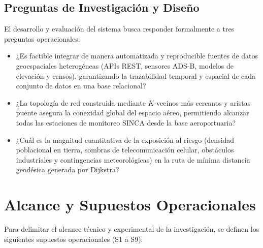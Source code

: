 \documentclass[letterpaper,12pt]{article}
\begin{document}
\subsection{Preguntas de Investigación y Diseño}
\label{subsec:preguntas_diseno}

El desarrollo y evaluación del sistema busca responder formalmente a tres preguntas operacionales:

\begin{itemize}
    \item[\textbf{P1.}] ¿Es factible integrar de manera automatizada y reproducible fuentes de datos geoespaciales heterogéneas (APIs REST, sensores ADS-B, modelos de elevación y censos), garantizando la trazabilidad temporal y espacial de cada conjunto de datos en una base relacional?
    \item[\textbf{P2.}] ¿La topología de red construida mediante $K$-vecinos más cercanos y aristas puente asegura la conexidad global del espacio aéreo, permitiendo alcanzar todas las estaciones de monitoreo SINCA desde la base aeroportuaria?
    \item[\textbf{P3.}] ¿Cuál es la magnitud cuantitativa de la exposición al riesgo (densidad poblacional en tierra, sombras de telecomunicación celular, obstáculos industriales y contingencias meteorológicas) en la ruta de mínima distancia geodésica generada por Dijkstra?
\end{itemize}

\section{Alcance y Supuestos Operacionales}
\label{sec:alcance}

Para delimitar el alcance técnico y experimental de la investigación, se definen los siguientes supuestos operacionales (S1 a S9):
\end{document}

